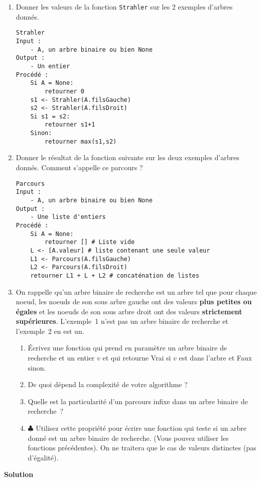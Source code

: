\begin{exercice}
\begin{enumerate}
\item Donner les valeurs de la fonction {\tt Strahler} sur les 2 exemples d'arbres donnés.
\begin{lstlisting}
Strahler
Input :
    - A, un arbre binaire ou bien None
Output :
    - Un entier
Procédé :
	Si A = None:
	    retourner 0
	s1 <- Strahler(A.filsGauche)
	s2 <- Strahler(A.filsDroit)
	Si s1 = s2:
	    retourner s1+1
	Sinon:
	    retourner max(s1,s2)
\end{lstlisting}


\item Donner le résultat de la fonction suivante sur les deux exemples d'arbres donnés. Comment s'appelle ce parcours ?

\begin{lstlisting}
Parcours
Input :
    - A, un arbre binaire ou bien None
Output :
    - Une liste d'entiers
Procédé :
	Si A = None:
	    retourner [] # Liste vide
	L <- [A.valeur] # liste contenant une seule valeur
	L1 <- Parcours(A.filsGauche)
	L2 <- Parcours(A.filsDroit)
	retourner L1 + L + L2 # concaténation de listes
\end{lstlisting}

\item On rappelle qu'un arbre binaire de recherche est un arbre tel que pour chaque noeud, les noeuds de son sous arbre gauche ont des valeurs \textbf{plus petites ou égales} et les noeuds de son sous arbre droit ont des valeurs \textbf{strictement supérieures}. L'exemple~1 n'est pas un arbre  binaire de recherche et l'exemple~2 en est un. 
\begin{enumerate}
\item \'Ecrivez une fonction qui prend en paramètre un arbre binaire de recherche et un entier $v$ et qui retourne Vrai si $v$ est dans l'arbre et Faux sinon.
\item De quoi dépend la complexité de votre algorithme ?
\item Quelle est la particularité d'un parcours infixe dans un arbre binaire de recherche~?
\item $\clubsuit$ Utilisez cette propriété pour écrire une fonction qui teste si un arbre donné est un arbre binaire de recherche. (Vous pouvez utiliser les fonctions précédentes). On ne traitera que le cas de valeurs distinctes (pas d'égalité). 
\end{enumerate}

\end{enumerate}

\textbf{Solution}


\end{exercice}
